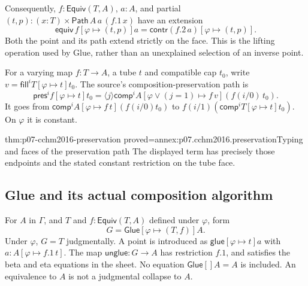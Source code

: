 Consequently, \(f:\mathsf{Equiv}(T,A)\), \(a:A\), and partial
\((t,p):(x:T)\times\mathsf{Path}\,A\,a\,(f.1\,x)\) have an extension
\[
 \mathsf{equiv}\,f[\varphi\mapsto(t,p)]a
 =\mathsf{contr}(f.2\,a)[\varphi\mapsto(t,p)].
\]
Both the point and its path extend strictly on the face.  This is the
lifting operation used by Glue, rather than an unexplained selection
of an inverse point.

For a varying map \(f:T\to A\), a tube \(t\) and compatible cap \(t_0\),
write \(v=\mathsf{fill}^{i}T[\varphi\mapsto t]t_0\).  The source's
composition-preservation path is
\[
 \mathsf{pres}^{i}f[\varphi\mapsto t]t_0
 =\langle j\rangle\mathsf{comp}^{i}A
       [\varphi\vee(j=1)\mapsto f\,v](f(i/0)\,t_0).
\]
It goes from
\(\mathsf{comp}^{i}A[\varphi\mapsto f\,t](f(i/0)t_0)\)
to \(f(i/1)(\mathsf{comp}^{i}T[\varphi\mapsto t]t_0)\).
On \(\varphi\) it is constant.
\begin{hblemma}{thm:p07-cchm2016-preservation}
 {proved=annex:p07.cchm2016.preservation}{Typing and faces of the preservation path}
The displayed term has precisely those endpoints and the stated
constant restriction on the tube face.
\end{hblemma}

\subsection{Glue and its actual composition algorithm}
\label{sec:p07-cchm2016-glue}

For \(A\) in \(\Gamma\), and \(T\) and \(f:\mathsf{Equiv}(T,A)\)
defined under \(\varphi\), form
\[
 G=\mathsf{Glue}[\varphi\mapsto(T,f)]A.
\]
Under \(\varphi\), \(G=T\) judgmentally.  A point is introduced as
\(\mathsf{glue}[\varphi\mapsto t]a\) with
\(a:A[\varphi\mapsto f.1\,t]\).  The map \(\mathsf{unglue}:G\to A\)
has restriction \(f.1\), and satisfies the beta and eta equations in
the sheet.  No equation \(\mathsf{Glue}[]A=A\) is included.  An
equivalence to \(A\) is not a judgmental collapse to \(A\).

